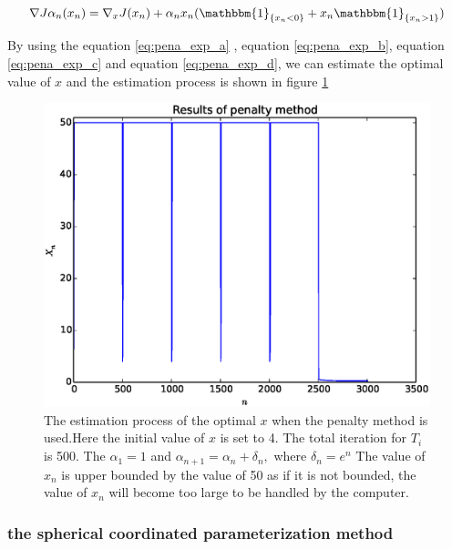 \documentclass[a4paper,12pt]{article}
\begin{document}
\begin{equation}\label{eq:pena_exp_d}
\nabla J{\alpha_ n}(x_n) =\nabla _x J(x_n)+\alpha_n x_n( \mathbbm{1}_{\{x_n<0\}}+ x_n \mathbbm{1}_{\{x_n>1\}})
\end{equation}

By using the equation \ref{eq:pena_exp_a} , equation \ref{eq:pena_exp_b},  equation \ref{eq:pena_exp_c}  and equation \ref{eq:pena_exp_d}, we can estimate the optimal value of $x$ and the estimation process is shown in figure \ref{fig:poly_result}\\

\begin{figure}[H]
\begin{center}
\includegraphics[width=1.0\linewidth]{polynomial_est.eps}


\end{center}
   \caption{The estimation process of the optimal $x$ when the penalty method is used.Here the initial value of $x$ is set to 4. The total iteration for $T_i$ is 500. The $\alpha_1 = 1$ and $\alpha _{n+1} = \alpha _n + \delta_n,$ where $\delta _ n=e^n$ The value of $x_n$ is upper bounded by the value of 50 as if it is not bounded, the value of $x_n$ will become too large to be handled by the computer. }
\label{fig:poly_result}
\end{figure}


\subsubsection{the spherical coordinated parameterization method }
\end{document}
